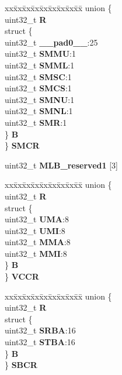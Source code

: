 \begin{DoxyCompactItemize}
\begin{tabbing}
\end{tabbing}\item 
\mbox{\label{structMLB__tag_affe9d3a5c5999b7b4830a6e7c214a601}} 
\begin{tabbing}
xx\=xx\=xx\=xx\=xx\=xx\=xx\=xx\=xx\=\kill
union \{\\
\>uint32\_t {\bfseries R}\\
\>struct \{\\
\>\>uint32\_t {\bfseries \_\_pad0\_\_}:25\\
\>\>uint32\_t {\bfseries SMMU}:1\\
\>\>uint32\_t {\bfseries SMML}:1\\
\>\>uint32\_t {\bfseries SMSC}:1\\
\>\>uint32\_t {\bfseries SMCS}:1\\
\>\>uint32\_t {\bfseries SMNU}:1\\
\>\>uint32\_t {\bfseries SMNL}:1\\
\>\>uint32\_t {\bfseries SMR}:1\\
\>\} {\bfseries B}\\
\} {\bfseries SMCR}\\

\end{tabbing}\item 
\mbox{\label{structMLB__tag_aa521383a1409c6a422930d7f81a36e47}} 
uint32\+\_\+t {\bfseries M\+L\+B\+\_\+reserved1} \mbox{[}3\mbox{]}
\item 
\mbox{\label{structMLB__tag_a47a407f467c8596aae9fb6741a873f20}} 
\begin{tabbing}
xx\=xx\=xx\=xx\=xx\=xx\=xx\=xx\=xx\=\kill
union \{\\
\>uint32\_t {\bfseries R}\\
\>struct \{\\
\>\>uint32\_t {\bfseries UMA}:8\\
\>\>uint32\_t {\bfseries UMI}:8\\
\>\>uint32\_t {\bfseries MMA}:8\\
\>\>uint32\_t {\bfseries MMI}:8\\
\>\} {\bfseries B}\\
\} {\bfseries VCCR}\\

\end{tabbing}\item 
\mbox{\label{structMLB__tag_a503f181befd30cc1e2a9141e56e1a5f0}} 
\begin{tabbing}
xx\=xx\=xx\=xx\=xx\=xx\=xx\=xx\=xx\=\kill
union \{\\
\>uint32\_t {\bfseries R}\\
\>struct \{\\
\>\>uint32\_t {\bfseries SRBA}:16\\
\>\>uint32\_t {\bfseries STBA}:16\\
\>\} {\bfseries B}\\
\} {\bfseries SBCR}\\


\end{tabbing}
\end{DoxyCompactItemize}
